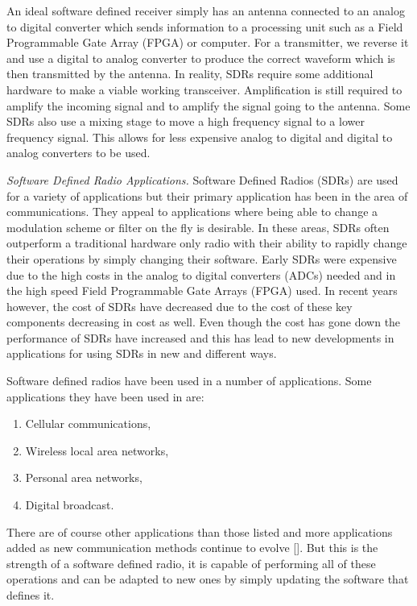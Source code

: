An ideal software defined receiver simply has an antenna connected to an analog to digital converter which sends information to a processing unit such as a Field Programmable Gate Array (FPGA) or computer.  For a transmitter, we reverse it and use a digital to analog converter to produce the correct waveform which is then transmitted by the antenna.  In reality, SDRs require some additional hardware to make a viable working transceiver.  Amplification is still required to amplify the incoming signal and to amplify the signal going to the antenna.  Some SDRs also use a mixing stage to move a high frequency signal to a lower frequency signal.  This allows for less expensive analog to digital and digital to analog converters to be used.  

\emph{Software Defined Radio Applications.}  Software Defined Radios (SDRs) are used for a variety of applications but their primary application has been in the area of communications.  They appeal to applications where being able to change a modulation scheme or filter on the fly is desirable.  In these areas, SDRs often outperform a traditional hardware only radio with their ability to rapidly change their operations by simply changing their software.  Early SDRs were expensive due to the high costs in the analog to digital converters (ADCs) needed and in the high speed Field Programmable Gate Arrays (FPGA) used.  In recent years however, the cost of SDRs have decreased due to the cost of these key components decreasing in cost as well.  Even though the cost has gone down the performance of SDRs have increased and this has lead to new developments in applications for using SDRs in new and different ways.

Software defined radios have been used in a number of applications.  Some applications they have been used in are:

\begin{enumerate}
\item Cellular communications,
\item Wireless local area networks,
\item Personal area networks,
\item Digital broadcast.
\end{enumerate}

There are of course other applications than those listed and more applications added as new communication methods continue to evolve [\cite{jondral2005software}].  But this is the strength of a software defined radio, it is capable of performing all of these operations and can be adapted to new ones by simply updating the software that defines it.

